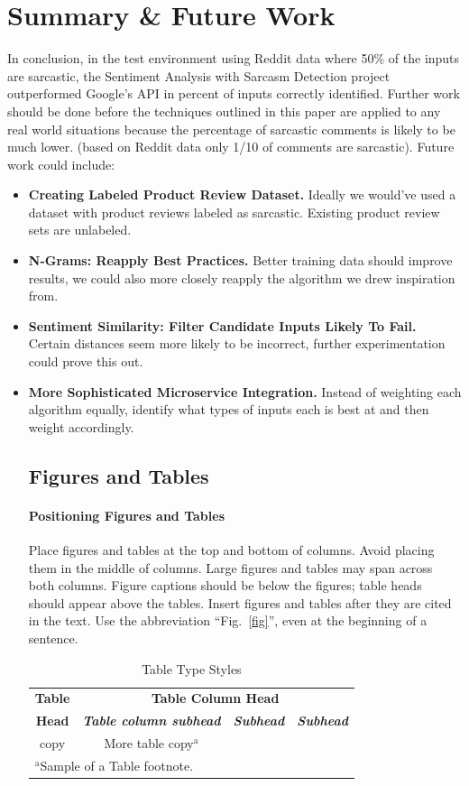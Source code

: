 \documentclass[conference]{IEEEtran}
\begin{document}
\section{Summary \& Future Work}
In conclusion, in the test environment using Reddit data where 50\% of the inputs are sarcastic, the Sentiment Analysis with Sarcasm Detection project outperformed Google’s API in percent of inputs correctly identified.  Further work should be done before the techniques outlined in this paper are applied to any real world situations because the percentage of sarcastic comments is likely to be much lower. (based on Reddit data only 1/10 of comments are sarcastic).  Future work could include: 
\begin{itemize}
\item \textbf{Creating Labeled Product Review Dataset.} Ideally we would’ve used a dataset with product reviews labeled as sarcastic.  Existing product review sets are unlabeled.
\item \textbf{N-Grams: Reapply Best Practices.}  Better training data should improve results, we could also more closely reapply the algorithm we drew inspiration from.
\item \textbf{Sentiment Similarity: Filter Candidate Inputs Likely To Fail.}  Certain distances seem more likely to be incorrect, further experimentation could prove this out.
\item \textbf{More Sophisticated Microservice Integration.}  Instead of weighting each algorithm equally, identify what types of inputs each is best at and then weight accordingly.



\subsection{Figures and Tables}
\paragraph{Positioning Figures and Tables} Place figures and tables at the top and 
bottom of columns. Avoid placing them in the middle of columns. Large 
figures and tables may span across both columns. Figure captions should be 
below the figures; table heads should appear above the tables. Insert 
figures and tables after they are cited in the text. Use the abbreviation 
``Fig.~\ref{fig}'', even at the beginning of a sentence.

\begin{table}[htbp]
\caption{Table Type Styles}
\begin{center}
\begin{tabular}{|c|c|c|c|}
\hline
\textbf{Table}&\multicolumn{3}{|c|}{\textbf{Table Column Head}} \\
\cline{2-4} 
\textbf{Head} & \textbf{\textit{Table column subhead}}& \textbf{\textit{Subhead}}& \textbf{\textit{Subhead}} \\
\hline
copy& More table copy$^{\mathrm{a}}$& &  \\
\hline
\multicolumn{4}{l}{$^{\mathrm{a}}$Sample of a Table footnote.}
\end{tabular}
\label{tab1}
\end{center}
\end{table}


\end{itemize}
\end{document}
